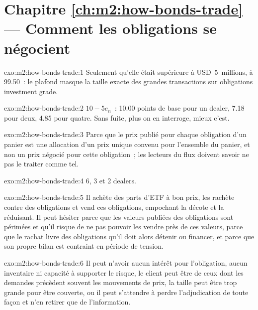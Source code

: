 \section*{Chapitre \ref{ch:m2:how-bonds-trade} --- Comment les obligations se négocient}

\begin{solution}{exo:m2:how-bonds-trade:1}
Seulement qu'elle était supérieure à USD~5~millions, à 99.50~: le plafond masque la taille exacte des
grandes transactions sur obligations investment grade.
\end{solution}

\begin{solution}{exo:m2:how-bonds-trade:2}
$10 - 5e_n$~: 10.00 points de base pour un dealer, 7.18 pour deux, 4.85 pour quatre. Sans
fuite, plus on en interroge, mieux c'est.
\end{solution}

\begin{solution}{exo:m2:how-bonds-trade:3}
Parce que le prix publié pour chaque obligation d'un panier est une allocation d'un prix unique convenu pour
l'ensemble du panier, et non un prix négocié pour cette obligation~; les lecteurs du flux doivent savoir
ne pas le traiter comme tel.
\end{solution}

\begin{solution}{exo:m2:how-bonds-trade:4}
6, 3 et 2 dealers.
\end{solution}

\begin{solution}{exo:m2:how-bonds-trade:5}
Il achète des parts d'ETF à bon prix, les rachète contre des obligations et vend ces obligations, empochant
la décote et la réduisant. Il peut hésiter parce que les valeurs publiées des obligations sont périmées et
qu'il risque de ne pas pouvoir les vendre près de ces valeurs, parce que le rachat livre des obligations
qu'il doit alors détenir ou financer, et parce que son propre bilan est contraint en période de
tension.
\end{solution}

\begin{solution}{exo:m2:how-bonds-trade:6}
Il peut n'avoir aucun intérêt pour l'obligation, aucun inventaire ni capacité à supporter le risque, le client
peut être de ceux dont les demandes précèdent souvent les mouvements de prix, la taille peut être trop grande pour être couverte,
ou il peut s'attendre à perdre l'adjudication de toute façon et n'en retirer que de l'information.
\end{solution}

